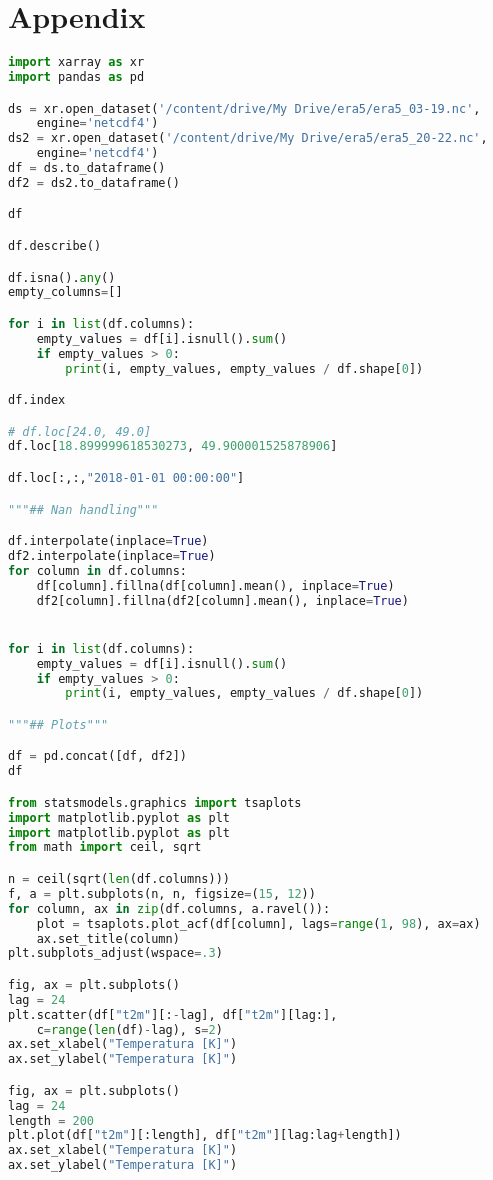 \section*{Appendix}

\begin{lstlisting}[label=python-listing,caption={Kod źródłowy},language=python]
import xarray as xr
import pandas as pd

ds = xr.open_dataset('/content/drive/My Drive/era5/era5_03-19.nc', 
    engine='netcdf4')
ds2 = xr.open_dataset('/content/drive/My Drive/era5/era5_20-22.nc', 
    engine='netcdf4')
df = ds.to_dataframe()
df2 = ds2.to_dataframe()

df

df.describe()

df.isna().any()
empty_columns=[]

for i in list(df.columns):
    empty_values = df[i].isnull().sum()
    if empty_values > 0:
        print(i, empty_values, empty_values / df.shape[0])

df.index

# df.loc[24.0, 49.0]
df.loc[18.899999618530273, 49.900001525878906]

df.loc[:,:,"2018-01-01 00:00:00"]

"""## Nan handling"""

df.interpolate(inplace=True)
df2.interpolate(inplace=True)
for column in df.columns:
    df[column].fillna(df[column].mean(), inplace=True)
    df2[column].fillna(df2[column].mean(), inplace=True)


for i in list(df.columns):
    empty_values = df[i].isnull().sum()
    if empty_values > 0:
        print(i, empty_values, empty_values / df.shape[0])

"""## Plots"""

df = pd.concat([df, df2])
df

from statsmodels.graphics import tsaplots
import matplotlib.pyplot as plt
import matplotlib.pyplot as plt
from math import ceil, sqrt

n = ceil(sqrt(len(df.columns)))
f, a = plt.subplots(n, n, figsize=(15, 12))
for column, ax in zip(df.columns, a.ravel()):
    plot = tsaplots.plot_acf(df[column], lags=range(1, 98), ax=ax)
    ax.set_title(column)
plt.subplots_adjust(wspace=.3)

fig, ax = plt.subplots()
lag = 24
plt.scatter(df["t2m"][:-lag], df["t2m"][lag:], 
    c=range(len(df)-lag), s=2)
ax.set_xlabel("Temperatura [K]")
ax.set_ylabel("Temperatura [K]")

fig, ax = plt.subplots()
lag = 24
length = 200
plt.plot(df["t2m"][:length], df["t2m"][lag:lag+length])
ax.set_xlabel("Temperatura [K]")
ax.set_ylabel("Temperatura [K]")


\end{lstlisting}
